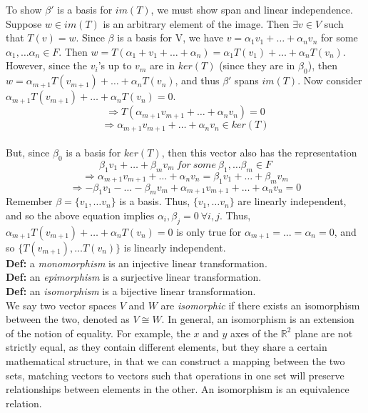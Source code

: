 \documentclass[12pt]{article}
\begin{document}
To show $\beta'$ is a basis for $im(T)$, we must show span and linear independence. Suppose $w \in im(T)$ is an arbitrary element of the image. Then $\exists v \in V$ such that $T(v) = w$. Since $\beta$ is a basis for V, we have $v = \alpha_1 v_1 + \dots + \alpha_n v_n$ for some $\alpha_1, \dots \alpha_n \in F$. Then $w = T(\alpha_1 + v_1 + \dots + \alpha_n) = \alpha_1 T(v_1) + \dots + \alpha_n T(v_n)$. However, since the $v_i$'s up to $v_m$ are in $ker(T)$ (since they are in $\beta_0$), then $w = \alpha_{m + 1} T(v_{m + 1}) + \dots + \alpha_n T(v_n)$, and thus $\beta'$ spans $im(T)$. Now consider $\alpha_{m + 1} T(v_{m + 1}) + \dots + \alpha_n T(v_n) = 0$.
$$\Rightarrow T(\alpha_{m + 1} v_{m + 1} + \dots + \alpha_n v_n) = 0$$
$$\Rightarrow \alpha_{m + 1} v_{m + 1} + \dots + \alpha_n v_n \in ker(T)$$\\
But, since $\beta_0$ is a basis for $ker(T)$, then this vector also has the representation 
$$\beta_1 v_1 + \dots + \beta_m v_m\ for\ some\ \beta_1, \dots \beta_m \in F$$
$$\Rightarrow \alpha_{m + 1} v_{m + 1} + \dots + \alpha_n v_n = \beta_1 v_1 + \dots + \beta_m v_m$$
$$\Rightarrow -\beta_1 v_1 - \dots - \beta_m v_m + \alpha_{m + 1} v_{m + 1} + \dots + \alpha_n v_n = 0$$
Remember $\beta = \{ v_1, \dots v_n \}$ is a basis. Thus, $\{ v_1, \dots v_n\}$ are linearly independent, and so the above equation implies $\alpha_i, \beta_j = 0\ \forall i, j$. Thus, $\alpha_{m + 1} T(v_{m + 1} ) + \dots + \alpha_n T(v_n) = 0$ is only true for $\alpha_{m + 1} = \dots = \alpha_n = 0$, and so $\{ T(v_{m + 1}), \dots T(v_n) \}$ is linearly independent.\\

\textbf{Def: }a \emph{monomorphism} is an injective linear transformation.\\

\textbf{Def: }an \emph{epimorphism} is a surjective linear transformation.\\

\textbf{Def: }an \emph{isomorphism} is a bijective linear transformation.\\

We say two vector spaces $V$ and $W$ are \emph{isomorphic} if there exists an isomorphism between the two, denoted as $V \cong W$. In general, an isomorphism is an extension of the notion of equality. For example, the $x$ and $y$ axes of the $\mathbb{R}^2$ plane are not strictly equal, as they contain different elements, but they share a certain mathematical structure, in that we can construct a mapping between the two sets, matching vectors to vectors such that operations in one set will preserve relationships between elements in the other. An isomorphism is an equivalence relation.\\
\end{document}
